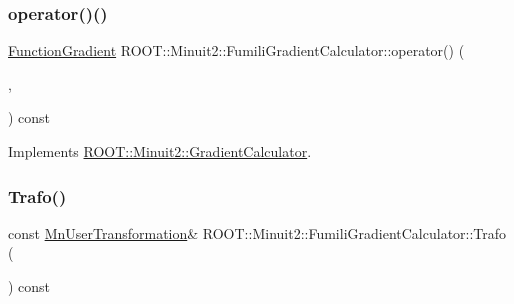 \subsubsection{\texorpdfstring{operator()()}{operator()()}\hspace{0.1cm}{\footnotesize\ttfamily [4/4]}}
{\footnotesize\ttfamily \mbox{\hyperlink{classROOT_1_1Minuit2_1_1FunctionGradient}{Function\+Gradient}} R\+O\+O\+T\+::\+Minuit2\+::\+Fumili\+Gradient\+Calculator\+::operator() (\begin{DoxyParamCaption}\item[{const \mbox{\hyperlink{classROOT_1_1Minuit2_1_1MinimumParameters}{Minimum\+Parameters}} \&}]{,  }\item[{const \mbox{\hyperlink{classROOT_1_1Minuit2_1_1FunctionGradient}{Function\+Gradient}} \&}]{ }\end{DoxyParamCaption}) const\hspace{0.3cm}{\ttfamily [virtual]}}



Implements \mbox{\hyperlink{classROOT_1_1Minuit2_1_1GradientCalculator_a1809c1e8a89d32aabf7835e9690c2916}{R\+O\+O\+T\+::\+Minuit2\+::\+Gradient\+Calculator}}.

\mbox{\label{classROOT_1_1Minuit2_1_1FumiliGradientCalculator_a60672fa936f927ab01a7eb9ede6cb6e0}} 
\subsubsection{\texorpdfstring{Trafo()}{Trafo()}\hspace{0.1cm}{\footnotesize\ttfamily [1/2]}}
{\footnotesize\ttfamily const \mbox{\hyperlink{classROOT_1_1Minuit2_1_1MnUserTransformation}{Mn\+User\+Transformation}}\& R\+O\+O\+T\+::\+Minuit2\+::\+Fumili\+Gradient\+Calculator\+::\+Trafo (\begin{DoxyParamCaption}{ }\end{DoxyParamCaption}) const\hspace{0.3cm}{\ttfamily [inline]}}

\mbox{\label{classROOT_1_1Minuit2_1_1FumiliGradientCalculator_a60672fa936f927ab01a7eb9ede6cb6e0}} 
